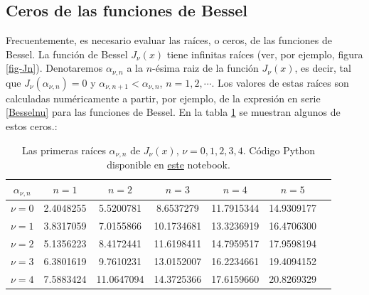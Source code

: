 \subsection{Ceros de las funciones de Bessel}
Frecuentemente, es necesario evaluar las raíces, o ceros, de las funciones de Bessel. La función de Bessel $J_\nu(x)$ tiene infinitas raíces (ver, por ejemplo, figura \ref{fig-Jn}). Denotaremos $\alpha_{\nu,n}$ a la $n$-ésima raiz de la función $J_\nu(x)$, es decir, tal que $J_\nu(\alpha_{\nu,n})=0$ y $\alpha_{\nu,n+1}<\alpha_{\nu,n}$, $n=1,2,\cdots$. Los valores de estas raíces son calculadas numéricamente a partir, por ejemplo, de la expresión en serie \eqref{Besselnu} para las funciones de Bessel. En la tabla \ref{tabla:alphanun} se muestran algunos de estos ceros.:
\begin{table}
\begin{center}
\begin{tabular}{ccccccc}
\hline $\alpha_{\nu,n}$ & $n=1$ & $n=2$ & $n=3$ & $n=4$ & $n=5$ \\ \hline 
$\nu=0$ & 2.4048255 &  5.5200781 &  8.6537279 & 11.7915344 & 14.9309177\\
$\nu=1$ & 3.8317059 &  7.0155866 & 10.1734681 & 13.3236919 & 16.4706300\\
$\nu=2$ & 5.1356223 &  8.4172441 & 11.6198411 & 14.7959517 & 17.9598194 \\
$\nu=3$ & 6.3801619 &  9.7610231 & 13.0152007 & 16.2234661 & 19.4094152 \\
$\nu=4$ & 7.5883424 & 11.0647094 & 14.3725366 & 17.6159660 & 20.8269329 \\
\hline 
\end{tabular} 
\caption{Las primeras raíces $\alpha_{\nu,n}$ de $J_\nu(x)$, $\nu=0,1,2,3,4$. Código Python disponible en \href{https://github.com/gfrubi/FM2/blob/master/Notebooks/Bessel-Ceros.ipynb}{este} notebook.}
\label{tabla:alphanun}
\end{center}
\end{table}


